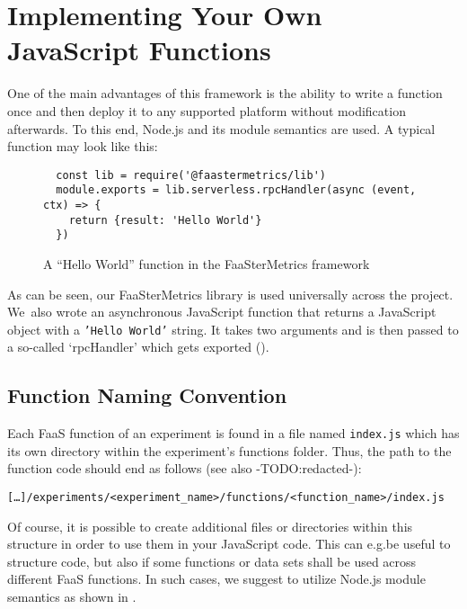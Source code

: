 \documentclass[../main.tex]{subfiles}
\begin{document}
\section{Implementing Your Own JavaScript Functions}\label{sec:jsFunctions}

One of the main advantages of this framework is the ability to write a function once 
and then deploy it to any supported platform without modification afterwards.
To this end, Node.js and its module semantics are used. A typical function may look like this:

\begin{figure}[H]
\begin{tcolorbox}
\begin{verbatim}
  const lib = require('@faastermetrics/lib')
  module.exports = lib.serverless.rpcHandler(async (event, ctx) => {
    return {result: 'Hello World'}
  })
\end{verbatim}
\end{tcolorbox}
\caption{A ``Hello World'' function in the FaaSterMetrics framework}%
\label{fig:fmHelloWorld}
\end{figure}

As can be seen, our FaaSterMetrics library is used universally across the project. 
We~also wrote an asynchronous JavaScript function that returns a JavaScript object with a \texttt{'Hello World'} string. 
It takes two arguments and is then passed to a so-called `rpcHandler' which gets exported (). 

\newpage{}%
\subsection{Function Naming Convention}\label{sub:functionNaming}

Each FaaS function of an experiment is found in a file named \texttt{index.js} which has its own directory within the experiment's functions folder.
Thus, the path to the function code should end as follows (see also -TODO:\@ redacted-):%
\begin{tcolorbox}
  \texttt{[\ldots]/experiments/<experiment\_name>/functions/<function\_name>/index.js}
\end{tcolorbox}

Of course, it is possible to create additional files or directories within this structure in order to use them in your JavaScript code.
This can e.g.\@ be useful to structure code, but also if some functions or data sets shall be used across different FaaS functions.
In such cases, we suggest to utilize Node.js module semantics as shown in .
\end{document}
